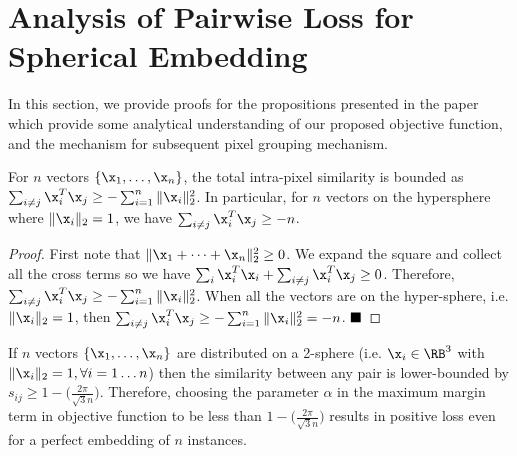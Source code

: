 \setcounter{section}{0}
\setcounter{propositions}{0}

\section{Analysis of Pairwise Loss for Spherical Embedding}
In this section, we provide proofs for the propositions presented in the paper
which provide some analytical understanding of our proposed objective function,
and the mechanism for subsequent pixel grouping mechanism.

\begin{propositions}
\label{theorem:ObjLowerBound_appendix}
For $n$ vectors $\{\x_1, \dots, \x_n\}$, the total intra-pixel similarity is
bounded as $\sum_{i\neq j} \x_i^T\x_j \ge -\sum_{i=1}^n  \Vert \x_i \Vert_2^2$.
In particular, for $n$ vectors on the hypersphere where $\Vert\x_i\Vert_2 = 1$,
we have $\sum_{i\neq j} \x_i^T\x_j \ge -n$.
\end{propositions}

\begin{proof}
  First note that $\Vert \x_1 + \dots + \x_n \Vert_2^2 \ge 0$.  We expand
  the square and collect all the cross terms so we have $\sum_{i} \x_i^T\x_i +
  \sum_{i\not=j}\x_i^T\x_j \ge 0$.  Therefore, $\sum_{i\not=j}\x_i^T\x_j \ge
  -\sum_{i=1}^n \Vert \x_i\Vert_2^2$.  When all the vectors are on the
  hyper-sphere, i.e. $\Vert \x_i\Vert_2 = 1$, then $\sum_{i\not=j}\x_i^T\x_j
  \ge -\sum_{i=1}^n \Vert \x_i\Vert_2^2= -n$. $\hfill\blacksquare$
\end{proof}




\begin{propositions}
\label{lemma:max_margin_appendix}
If $n$ vectors $\{\x_1, \dots, \x_n\}$ are distributed on a 2-sphere (i.e.
$\x_i \in \RB^3$ with $\Vert\x_i\Vert_2 = 1, \forall i=1\dots n$) then the
similarity between any pair is lower-bounded by $s_{ij} \geq
1-\Big(\frac{2\pi}{\sqrt{3}n} \Big)$. Therefore, choosing the parameter
$\alpha$ in the maximum margin term in objective function to be less
than
$1-\Big(\frac{2\pi}{\sqrt{3}n} \Big)$ results in positive loss even for
a perfect embedding of $n$ instances.
\end{propositions}

